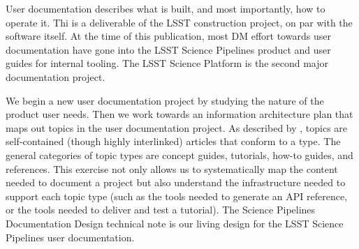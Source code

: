 User documentation describes what is built, and most importantly, how to operate it.
Thi is a deliverable of the LSST construction project, on par with the software itself.
At the time of this publication, most DM effort towards user documentation have gone into the LSST Science Pipelines product\cite{pipelines-guide} and user guides for internal tooling.
The LSST Science Platform\cite{LSE-319} is the second major documentation project.

We begin a new user documentation project by studying the nature of the product user needs.
Then we work towards an information architecture plan that maps out topics in the user documentation project.
As described by , topics are self-contained (though highly interlinked) articles that conform to a type.
The general categories of topic types are concept guides, tutorials, how-to guides, and references.\cite{Procida:2017}
This exercise not only allows us to systematically map the content needed to document a project but also understand the infrastructure needed to support each topic type (such as the tools needed to generate an API reference, or the tools needed to deliver and test a tutorial).
The Science Pipelines Documentation Design\cite{DMTN-030} technical note is our living design for the LSST Science Pipelines user documentation.

